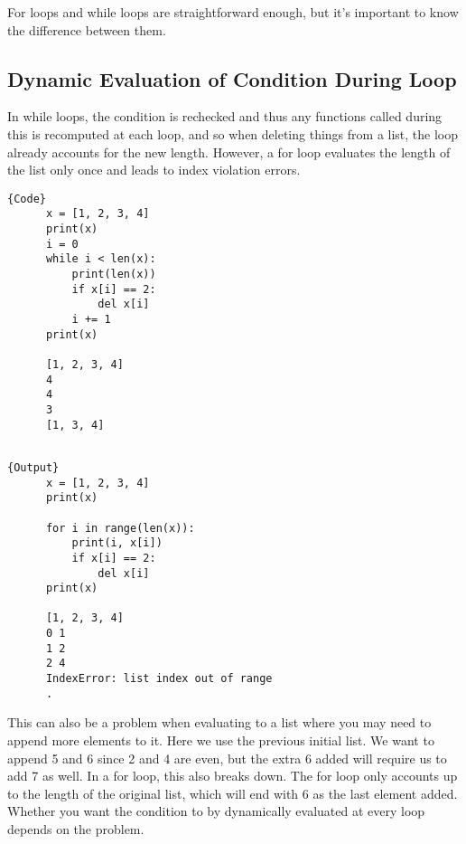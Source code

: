 \documentclass{article}
\begin{document}
  For loops and while loops are straightforward enough, but it's important to know the difference between them. 

  \subsection{Dynamic Evaluation of Condition During Loop}

    In while loops, the condition is rechecked and thus any functions called during this is recomputed at each loop, and so when deleting things from a list, the loop already accounts for the new length. However, a for loop evaluates the length of the list only once and leads to index violation errors.  

    \noindent\begin{minipage}{.5\textwidth}
    \begin{lstlisting}[]{Code}
      x = [1, 2, 3, 4]
      print(x)
      i = 0
      while i < len(x): 
          print(len(x))
          if x[i] == 2: 
              del x[i]
          i += 1
      print(x)

      [1, 2, 3, 4]
      4
      4
      3
      [1, 3, 4]
      
    \end{lstlisting}
    \end{minipage}
    \hfill
    \begin{minipage}{.49\textwidth}
    \begin{lstlisting}[]{Output}
      x = [1, 2, 3, 4]
      print(x) 

      for i in range(len(x)):
          print(i, x[i])
          if x[i] == 2: 
              del x[i]
      print(x)

      [1, 2, 3, 4]
      0 1
      1 2
      2 4
      IndexError: list index out of range
      .
    \end{lstlisting}
    \end{minipage}

    This can also be a problem when evaluating to a list where you may need to append more elements to it. Here we use the previous initial list. We want to append 5 and 6 since 2 and 4 are even, but the extra 6 added will require us to add 7 as well.   In a for loop, this also breaks down. The for loop only accounts up to the length of the original list, which will end with 6 as the last element added. Whether you want the condition to by dynamically evaluated at every loop depends on the problem. 
\end{document}
